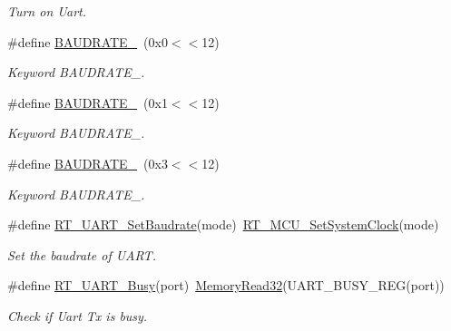 \begin{DoxyCompactItemize}
\begin{DoxyCompactList}\small\item\em Turn on Uart. \end{DoxyCompactList}\item 
\mbox{\label{a00173_a89d72bee69b33d0404d33f47608d16f0}} 
\#define \mbox{\hyperlink{a00173_a89d72bee69b33d0404d33f47608d16f0}{B\+A\+U\+D\+R\+A\+T\+E\+\_}}~(0x0$<$$<$12)
\begin{DoxyCompactList}\small\item\em Keyword B\+A\+U\+D\+R\+A\+T\+E\+\_. \end{DoxyCompactList}\item 
\mbox{\label{a00173_ab94a89ecf1976f304764aec119e215e7}} 
\#define \mbox{\hyperlink{a00173_ab94a89ecf1976f304764aec119e215e7}{B\+A\+U\+D\+R\+A\+T\+E\+\_}}~(0x1$<$$<$12)
\begin{DoxyCompactList}\small\item\em Keyword B\+A\+U\+D\+R\+A\+T\+E\+\_. \end{DoxyCompactList}\item 
\mbox{\label{a00173_a9c74d2185a532185624b8dc3086f8e3e}} 
\#define \mbox{\hyperlink{a00173_a9c74d2185a532185624b8dc3086f8e3e}{B\+A\+U\+D\+R\+A\+T\+E\+\_}}~(0x3$<$$<$12)
\begin{DoxyCompactList}\small\item\em Keyword B\+A\+U\+D\+R\+A\+T\+E\+\_. \end{DoxyCompactList}\item 
\#define \mbox{\hyperlink{a00173_a565befb27caf782083358e0ad81af3a3}{R\+T\+\_\+\+U\+A\+R\+T\+\_\+\+Set\+Baudrate}}(mode)~\mbox{\hyperlink{a00068_a017f8665ec51267680fc0e536db19c13}{R\+T\+\_\+\+M\+C\+U\+\_\+\+Set\+System\+Clock}}(mode)
\begin{DoxyCompactList}\small\item\em Set the baudrate of U\+A\+RT. \end{DoxyCompactList}\item 
\#define \mbox{\hyperlink{a00173_a3ab834a97a200601f16b923a705f3f01}{R\+T\+\_\+\+U\+A\+R\+T\+\_\+\+Busy}}(port)~\mbox{\hyperlink{a00068_a2d484dc15bdf30ee11ab3b05f31f0e16}{Memory\+Read32}}(U\+A\+R\+T\+\_\+\+B\+U\+S\+Y\+\_\+\+R\+EG(port))
\begin{DoxyCompactList}\small\item\em Check if Uart Tx is busy. \end{DoxyCompactList}\item 
$$
\end{DoxyCompactItemize}
